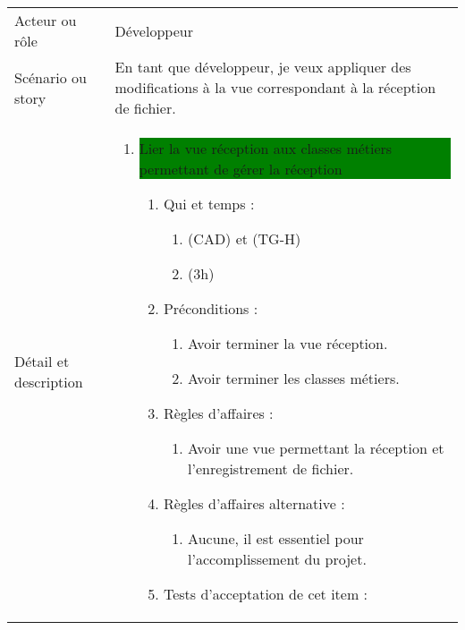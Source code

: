 \begin{longtable}{|l|p{}|}
\hline
    \rowcolor{Gray}
    \multicolumn{2}{|l|}{2} \\
\hline
    Acteur ou rôle & Développeur  \\
\hline
    Scénario ou story & En tant que développeur, je veux appliquer des modifications à la vue correspondant à la réception de fichier. \\
\hline
    Détail et description &
        \begin{enumerate}[label*=\arabic*.]
            \item \colorbox{Green}{\parbox{13cm}{Lier la vue réception aux classes métiers permettant de gérer la réception}}
            \begin{enumerate}[label*=\arabic*.]
                    \item Qui et temps :
                    \begin{enumerate}[label*=\arabic*.]
                        \item (CAD) et (TG-H)
                        \item (3h)
                    \end{enumerate}
                    \item Préconditions :
                    \begin{enumerate}[label*=\arabic*.]
                        \item Avoir terminer la vue réception.
                        \item Avoir terminer les classes métiers.
                    \end{enumerate}
                    \item Règles d’affaires :
                    \begin{enumerate}[label*=\arabic*.]
                        \item Avoir une vue permettant la réception et l'enregistrement de fichier.
                    \end{enumerate}
                    \item Règles d’affaires alternative :
                    \begin{enumerate}[label*=\arabic*.]
                        \item Aucune, il est essentiel pour l'accomplissement du projet.
                    \end{enumerate}
                    \item Tests d'acceptation de cet item :
                    \begin{enumerate}[label*=\arabic*.]

\end{enumerate}
\end{enumerate}
\end{enumerate}
\end{longtable}
